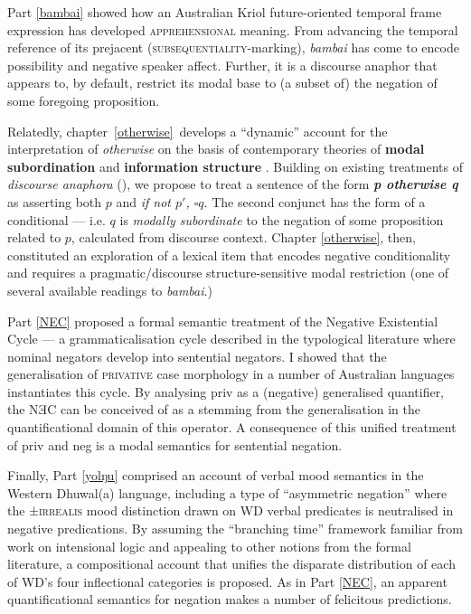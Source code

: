 \documentclass[12pt,dvipsnames]{report}
\begin{document}
Part \ref{bambai} showed how an Australian Kriol future-oriented temporal frame expression has developed \textsc{apprehensional} meaning. From advancing the temporal reference of its prejacent (\textsc{subsequentiality}-marking), \textit{bambai} has come to encode possibility and negative speaker affect. Further, it is a discourse anaphor that appears to, by default, restrict its modal base to (a subset of) the negation of some foregoing proposition.

Relatedly, chapter~\ref{otherwise}~develops a ``dynamic'' account for the interpretation of \textit{otherwise} on the basis of contemporary theories of \textbf{modal subordination} \citep{Roberts1989,Roberts2020,Roberts1995} and \textbf{information structure} \citep[e.g.][]{Roberts2012}. Building on existing treatments of \textit{discourse anaphora} (\citet{Webber2001,Kruijff-Korbayova2001}), we propose to treat a sentence of the form \textbf{\textit{p otherwise q}} as asserting both $ p $ and \textit{if not $ p' $, $ \square q $}. The second conjunct has the form of a conditional --- i.e. $ q $ is \textit{modally subordinate} to the negation of some proposition related to $ p $, calculated from discourse context. Chapter \ref{otherwise}, then, constituted an exploration of a lexical item that encodes negative conditionality and requires a pragmatic/discourse structure-sensitive modal restriction (one of several available readings to \textit{bambai}.)

Part \ref{NEC} proposed a formal semantic treatment of the Negative Existential Cycle --- a grammaticalisation cycle described in the typological literature where nominal negators develop into sentential negators. I showed that the generalisation of \textsc{privative} case morphology in a number of Australian languages instantiates this cycle. By analysing \gls{priv} as a (negative) generalised quantifier, the NƎC can be conceived of as a stemming from the generalisation in the quantificational domain of this operator. A consequence of this unified treatment of \gls{priv} and \gls{neg} is a modal semantics for sentential negation.

Finally, Part \ref{yolŋu} comprised an account of verbal mood semantics in the Western Dhuwal(a) language, including a type of ``asymmetric negation'' where the ±\textsc{irrealis} mood distinction drawn on WD verbal predicates is neutralised in negative predications. By assuming the ``branching time'' framework familiar from work on intensional logic and appealing to other notions from the formal literature, a compositional account that unifies the disparate distribution of each of WD's four inflectional categories is proposed. As in Part \ref{NEC}, an apparent quantificational semantics for negation makes a number of felicitous predictions.
\end{document}
